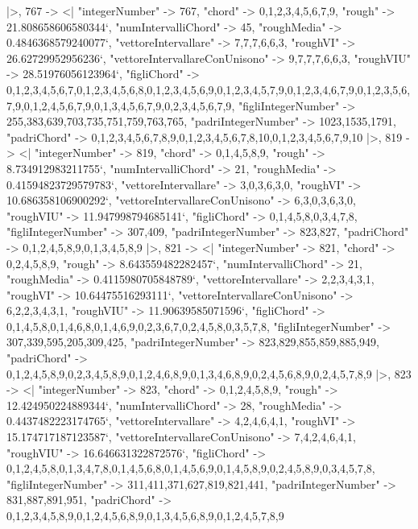 \documentclass[
]{article}
\begin{document}
\begin{DatasetVerbatim}
  |>,
  767 -> <|
    "integerNumber" -> 767,
    "chord" -> {0,1,2,3,4,5,6,7,9},
    "rough" -> 21.808658606580344`,
    "numIntervalliChord" -> 45,
    "roughMedia" -> 0.4846368579240077`,
    "vettoreIntervallare" -> {7,7,7,6,6,3},
    "roughVI" -> 26.62729952956236`,
    "vettoreIntervallareConUnisono" -> {9,7,7,7,6,6,3},
    "roughVIU" -> 28.51976056123964`,
    "figliChord" -> {{0,1,2,3,4,5,6,7},{0,1,2,3,4,5,6,8},{0,1,2,3,4,5,6,9},{0,1,2,3,4,5,7,9},{0,1,2,3,4,6,7,9},{0,1,2,3,5,6,7,9},{0,1,2,4,5,6,7,9},{0,1,3,4,5,6,7,9},{0,2,3,4,5,6,7,9}},
    "figliIntegerNumber" -> {255,383,639,703,735,751,759,763,765},
    "padriIntegerNumber" -> {1023,1535,1791},
    "padriChord" -> {{0,1,2,3,4,5,6,7,8,9},{0,1,2,3,4,5,6,7,8,10},{0,1,2,3,4,5,6,7,9,10}}
  |>,
  819 -> <|
    "integerNumber" -> 819,
    "chord" -> {0,1,4,5,8,9},
    "rough" -> 8.734912983211755`,
    "numIntervalliChord" -> 21,
    "roughMedia" -> 0.41594823729579783`,
    "vettoreIntervallare" -> {3,0,3,6,3,0},
    "roughVI" -> 10.686358106900292`,
    "vettoreIntervallareConUnisono" -> {6,3,0,3,6,3,0},
    "roughVIU" -> 11.947998794685141`,
    "figliChord" -> {{0,1,4,5,8},{0,3,4,7,8}},
    "figliIntegerNumber" -> {307,409},
    "padriIntegerNumber" -> {823,827},
    "padriChord" -> {{0,1,2,4,5,8,9},{0,1,3,4,5,8,9}}
  |>,
  821 -> <|
    "integerNumber" -> 821,
    "chord" -> {0,2,4,5,8,9},
    "rough" -> 8.643559482282457`,
    "numIntervalliChord" -> 21,
    "roughMedia" -> 0.4115980705848789`,
    "vettoreIntervallare" -> {2,2,3,4,3,1},
    "roughVI" -> 10.64475516293111`,
    "vettoreIntervallareConUnisono" -> {6,2,2,3,4,3,1},
    "roughVIU" -> 11.90639585071596`,
    "figliChord" -> {{0,1,4,5,8},{0,1,4,6,8},{0,1,4,6,9},{0,2,3,6,7},{0,2,4,5,8},{0,3,5,7,8}},
    "figliIntegerNumber" -> {307,339,595,205,309,425},
    "padriIntegerNumber" -> {823,829,855,859,885,949},
    "padriChord" -> {{0,1,2,4,5,8,9},{0,2,3,4,5,8,9},{0,1,2,4,6,8,9},{0,1,3,4,6,8,9},{0,2,4,5,6,8,9},{0,2,4,5,7,8,9}}
  |>,
  823 -> <|
    "integerNumber" -> 823,
    "chord" -> {0,1,2,4,5,8,9},
    "rough" -> 12.424950224889344`,
    "numIntervalliChord" -> 28,
    "roughMedia" -> 0.4437482223174765`,
    "vettoreIntervallare" -> {4,2,4,6,4,1},
    "roughVI" -> 15.174717187123587`,
    "vettoreIntervallareConUnisono" -> {7,4,2,4,6,4,1},
    "roughVIU" -> 16.646631322872576`,
    "figliChord" -> {{0,1,2,4,5,8},{0,1,3,4,7,8},{0,1,4,5,6,8},{0,1,4,5,6,9},{0,1,4,5,8,9},{0,2,4,5,8,9},{0,3,4,5,7,8}},
    "figliIntegerNumber" -> {311,411,371,627,819,821,441},
    "padriIntegerNumber" -> {831,887,891,951},
    "padriChord" -> {{0,1,2,3,4,5,8,9},{0,1,2,4,5,6,8,9},{0,1,3,4,5,6,8,9},{0,1,2,4,5,7,8,9}}

\end{DatasetVerbatim}
\end{document}

